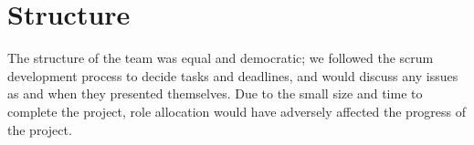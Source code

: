 \section{Structure}

The structure of the team was equal and democratic; we followed the scrum development process to decide tasks and deadlines, and would discuss any issues as and when they presented themselves.
Due to the small size and time to complete the project, role allocation would have adversely affected the progress of the project.
